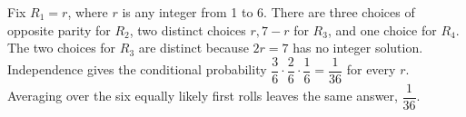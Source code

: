 Fix $R_1=r$, where $r$ is any integer from 1 to 6. There are three choices of opposite parity for $R_2$, two distinct choices $r,7-r$ for $R_3$, and one choice for $R_4$. The two choices for $R_3$ are distinct because $2r=7$ has no integer solution. Independence gives the conditional probability $\dfrac{3}{6}\cdot\dfrac{2}{6}\cdot\dfrac{1}{6}=\dfrac{1}{36}$ for every $r$. Averaging over the six equally likely first rolls leaves the same answer, $\boxed{\dfrac{1}{36}}$.
